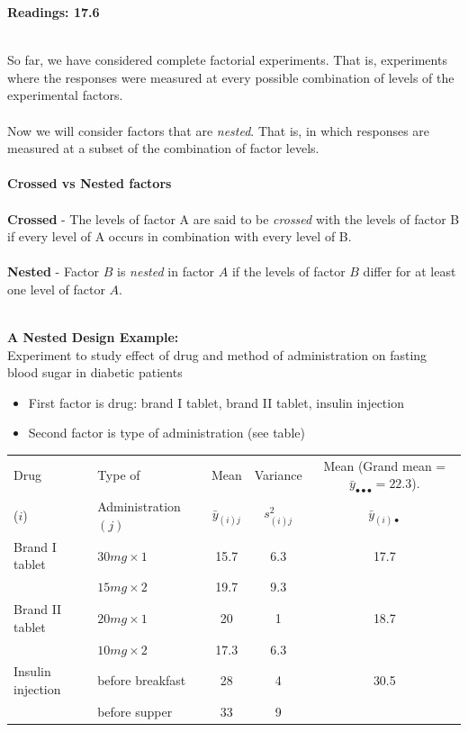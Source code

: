 \begin{center}\large\textbf{Readings: 17.6}\\
\normalsize \end{center}
\large ~\hrulefill
~\\
So far, we have considered complete factorial experiments.  That is, experiments where the responses were measured at every possible combination of levels of the experimental factors.  \\~\\
Now we will consider factors that are \textit{nested}.  That is, in which responses are measured at a subset of the combination of factor levels.  \\~\\
\textbf{Crossed vs Nested factors}\\~\\
\textbf{Crossed} - The levels of factor A are said to be \textit{crossed} with the levels of factor B if every level of A occurs in combination with every level of B.\\~\\
\textbf{Nested} - Factor $B$ is \textit{nested} in factor $A$ if the levels of factor $B$ differ for at least one level of factor $A$.\\~\\

\newpage

\textbf{A Nested Design Example:}\\
Experiment to study effect of drug and method of administration on fasting blood sugar in diabetic patients
\begin{itemize}
\item First factor is drug: brand I tablet, brand II tablet, insulin injection 
\item Second factor is type of administration (see table)
\end{itemize}

\begin{center}
\begin{tabular}{|llccc|} \hline
Drug & Type of & Mean & Variance & Mean (Grand mean = $\bar{y}_{\bullet\bullet\bullet}=22.3$).\\
($i$) & Administration $(j)$ & $\bar{y}_{(i)j}$ & $s_{(i)j}^2$ & $\bar{y}_{(i)\bullet}$\\ \hline
Brand I tablet & $30 mg \times 1$ & 15.7 & 6.3 & 17.7\\
& $15 mg \times 2$ & 19.7 & 9.3 & \\
Brand II tablet & $20 mg \times 1$ & 20 & 1 & 18.7 \\
& $10 mg \times 2$ & 17.3 & 6.3 & \\
Insulin injection & before breakfast  & 28  & 4 & 30.5\\
& before supper & 33 & 9 & \\ \hline
\end{tabular}
\end{center}


